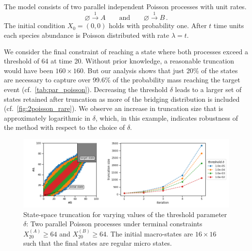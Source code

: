 \begin{model}
The model consists of two parallel independent Poisson processes with unit rates.
$$ \varnothing \xrightarrow{1} A \qquad\text{and}\qquad \varnothing \xrightarrow{1} B\,. $$
The initial condition $X_0=(0,0)$ holds with probability one. After $t$ time units each species abundance
is Poisson distributed with rate $\lambda=t$.
\end{model}
We consider the final constraint of reaching a state where both
processes exceed a threshold of 64 at time 20.
Without prior knowledge, a reasonable truncation would have been $160\times 160$. But our analysis shows that just 20\% of the states are necessary to capture over 99.6\% of the probability mass reaching the
target event (cf.\ \autoref{tab:par_poisson}).
Decreasing the threshold $\delta$ leads to a larger set of states retained after truncation as more of the bridging distribution is included (cf.\ \autoref{fig:2poisson_rare}).
We observe an increase in truncation size that is approximately
logarithmic in $\delta$, which, in this example, indicates robustness of the method with respect to the choice of $\delta$.
\begin{figure}[!t]
    \centering
    \includegraphics[width=\textwidth]{gfx/truncs.png}
	\caption[State-space truncation for varying values of the
	threshold parameter $\delta$]{State-space truncation for varying values of the
    threshold parameter $\delta$: Two parallel Poisson processes under terminal constraints $X_{20}^{(A)} \geq 64$ and $X_{20}^{(B)}\geq 64$.
    The initial macro-states are $16\times 16$ such that the final
    states are regular micro states.}
    \label{fig:2poisson_rare}
\end{figure}

